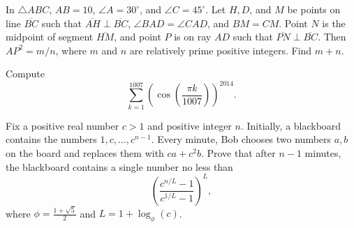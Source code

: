 \documentclass[11pt]{article}
\theoremstyle{definition}
\begin{document}
%	













\begin{question}[name={2014 AIME II, \href{https://artofproblemsolving.com/community/c4p3444121}{Problem 14}}]
	In $\triangle ABC$, $AB=10$, $\angle A=30^\circ$, and $\angle C=45^\circ$. Let $H,D$, and $M$ be points on line $\overline{BC}$ such that $\overline{AH}\perp\overline{BC}$, $\angle BAD=\angle CAD$, and $BM=CM$. Point $N$ is the midpoint of segment $\overline{HM}$, and point $P$ is on ray $AD$ such that $\overline{PN}\perp\overline{BC}$. Then $AP^2={m}/{n}$, where $m$ and $n$ are relatively prime positive integers. Find $m+n$.
\end{question}


%	








\begin{question}[name={2014 HMMT, Guts, \href{https://artofproblemsolving.com/community/c129h603992p3586759}{Problem 31}}]
	Compute\[\sum_{k=1}^{1007}\left(\cos\left(\dfrac{\pi k}{1007}\right)\right)^{2014}.\]
\end{question}




%	







\begin{question}[name={2014 HMMT, Team, \href{https://artofproblemsolving.com/community/c129h578715p3414359}{Problem 10}}]
	Fix a positive real number $c>1$ and positive integer $n$. Initially, a blackboard contains the numbers $1,c,\ldots, c^{n-1}$. Every minute, Bob chooses two numbers $a,b$ on the board and replaces them with $ca+c^2b$. Prove that after $n-1$ minutes, the blackboard contains a single number no less than\[\left(\dfrac{c^{n/L}-1}{c^{1/L}-1}\right)^L,\]where $\phi=\tfrac{1+\sqrt 5}2$ and $L=1+\log_\phi(c)$.
\end{question}
\end{document}
